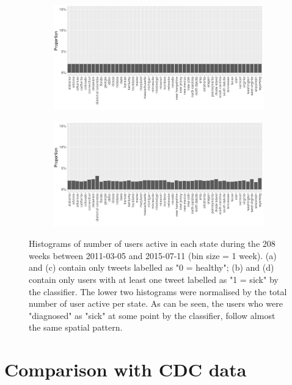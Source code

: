 \documentclass[11pt, a4paper]{report}\usepackage[]{graphicx}\usepackage[]{color}
\begin{document}
\begin{figure}[h]
    \begin{subfigure}[t]{0.49\textwidth}
  \includegraphics[width=1\linewidth]{activity_rel_healthy_user_statename_Twitter_full_aggregated.png}
  \caption{}
  \end{subfigure}
  \hfill
    \begin{subfigure}[t]{0.49\textwidth}
  \includegraphics[width=1\linewidth]{activity_rel_sick_user_statename_Twitter_full_aggregated.png}
  \caption{}
  \end{subfigure}
  \caption{Histograms of number of users active in each state during the 208 weeks between 2011-03-05 and 2015-07-11 (bin size = 1 week). (a) and (c) contain only tweets labelled as "0 = healthy"; (b) and (d) contain only users with at least one tweet labelled as "1 = sick" by the classifier. The lower two histograms were normalised by the total number of user active per state. As can be seen, the users who were "diagnosed" as "sick" at some point by the classifier, follow almost the same spatial pattern.}
  \label{fig:tweets_state_healthy_sick_user}
\end{figure}

\section{Comparison with CDC data}
\label{sec:comp_cdc}
\end{document}
